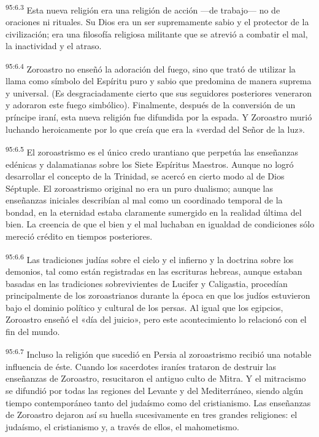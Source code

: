 \par
\textsuperscript{95:6.3} Esta nueva religión era una religión de acción ---de trabajo--- no de oraciones ni rituales. Su Dios era un ser supremamente sabio y el protector de la civilización; era una filosofía religiosa militante que se atrevió a combatir el mal, la inactividad y el atraso.

\par
\textsuperscript{95:6.4} Zoroastro no enseñó la adoración del fuego, sino que trató de utilizar la llama como símbolo del Espíritu puro y sabio que predomina de manera suprema y universal. (Es desgraciadamente cierto que sus seguidores posteriores veneraron y adoraron este fuego simbólico). Finalmente, después de la conversión de un príncipe iraní, esta nueva religión fue difundida por la espada. Y Zoroastro murió luchando heroicamente por lo que creía que era la «verdad del Señor de la luz».

\par
\textsuperscript{95:6.5} El zoroastrismo es el único credo urantiano que perpetúa las enseñanzas edénicas y dalamatianas sobre los Siete Espíritus Maestros. Aunque no logró desarrollar el concepto de la Trinidad, se acercó en cierto modo al de Dios Séptuple. El zoroastrismo original no era un puro dualismo; aunque las enseñanzas iniciales describían al mal como un coordinado temporal de la bondad, en la eternidad estaba claramente sumergido en la realidad última del bien. La creencia de que el bien y el mal luchaban en igualdad de condiciones sólo mereció crédito en tiempos posteriores.

\par
\textsuperscript{95:6.6} Las tradiciones judías sobre el cielo y el infierno y la doctrina sobre los demonios, tal como están registradas en las escrituras hebreas, aunque estaban basadas en las tradiciones sobrevivientes de Lucifer y Caligastia, procedían principalmente de los zoroastrianos durante la época en que los judíos estuvieron bajo el dominio político y cultural de los persas. Al igual que los egipcios, Zoroastro enseñó el «día del juicio», pero este acontecimiento lo relacionó con el fin del mundo.

\par
\textsuperscript{95:6.7} Incluso la religión que sucedió en Persia al zoroastrismo recibió una notable influencia de éste. Cuando los sacerdotes iraníes trataron de destruir las enseñanzas de Zoroastro, resucitaron el antiguo culto de Mitra. Y el mitracismo se difundió por todas las regiones del Levante y del Mediterráneo, siendo algún tiempo contemporáneo tanto del judaísmo como del cristianismo. Las enseñanzas de Zoroastro dejaron así su huella sucesivamente en tres grandes religiones: el judaísmo, el cristianismo y, a través de ellos, el mahometismo.

